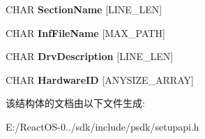 \begin{DoxyCompactItemize}
C\+H\+AR {\bfseries Section\+Name} \mbox{[}L\+I\+N\+E\+\_\+\+L\+EN\mbox{]}
\item 
\mbox{\label{struct___s_p___d_r_v_i_n_f_o___d_e_t_a_i_l___d_a_t_a___a_a919f3834fdbf5e11da99bc10e3547e54}} 
C\+H\+AR {\bfseries Inf\+File\+Name} \mbox{[}M\+A\+X\+\_\+\+P\+A\+TH\mbox{]}
\item 
\mbox{\label{struct___s_p___d_r_v_i_n_f_o___d_e_t_a_i_l___d_a_t_a___a_acbb3315bb37cb989901f187f0899b2c3}} 
C\+H\+AR {\bfseries Drv\+Description} \mbox{[}L\+I\+N\+E\+\_\+\+L\+EN\mbox{]}
\item 
\mbox{\label{struct___s_p___d_r_v_i_n_f_o___d_e_t_a_i_l___d_a_t_a___a_a2c1d267e4f759ffdd30a018a060c2c02}} 
C\+H\+AR {\bfseries Hardware\+ID} \mbox{[}A\+N\+Y\+S\+I\+Z\+E\+\_\+\+A\+R\+R\+AY\mbox{]}
\end{DoxyCompactItemize}


该结构体的文档由以下文件生成\+:\begin{DoxyCompactItemize}
\item 
E\+:/\+React\+O\+S-\/0../sdk/include/psdk/setupapi.\+h\end{DoxyCompactItemize}
